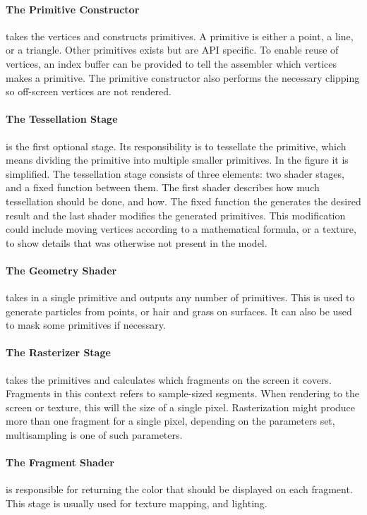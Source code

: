 \paragraph{The Primitive Constructor} takes the vertices and constructs primitives.
A primitive is either a point, a line, or a triangle.
Other primitives exists but are \gls{API} specific.
To enable reuse of vertices, an index buffer can be provided to tell the assembler which vertices makes a primitive.
The primitive constructor also performs the necessary clipping so off-screen vertices are not rendered.

\paragraph{The Tessellation Stage} is the first optional stage.
Its responsibility is to tessellate the primitive, which means dividing the primitive into multiple smaller primitives.
In the figure it is simplified.
The tessellation stage consists of three elements: two shader stages, and a fixed function between them.
The first shader describes how much tessellation should be done, and how.
The fixed function the generates the desired result and the last shader modifies the generated primitives.
This modification could include moving vertices according to a mathematical formula, or a texture, to show details that was otherwise not present in the model.

\paragraph{The Geometry Shader} takes in a single primitive and outputs any number of primitives.
This is used to generate particles from points, or hair and grass on surfaces.
It can also be used to mask some primitives if necessary.


\paragraph{The Rasterizer Stage} takes the primitives and calculates which fragments on the screen it covers.
Fragments in this context refers to sample-sized segments.
When rendering to the screen or texture, this will the size of a single pixel.
Rasterization might produce more than one fragment for a single pixel, depending on the parameters set, multisampling is one of such parameters.

\paragraph{The Fragment Shader} is responsible for returning the color that should be displayed on each fragment.
This stage is usually used for texture mapping, and lighting.

